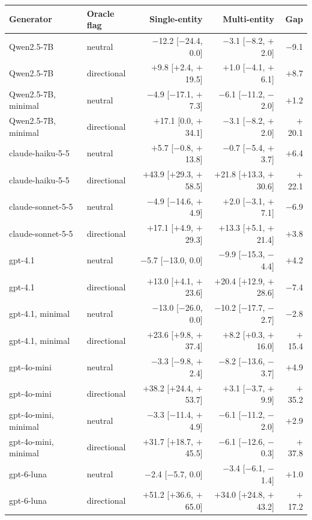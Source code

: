 \begin{table}[t]
\centering\small
\setlength{\tabcolsep}{6pt}
\begin{tabular}{@{}llrrr@{}}
\toprule
Generator & Oracle flag & Single-entity & Multi-entity & Gap \\
\midrule
Qwen2.5-7B & neutral & $-$12.2 [$-$24.4, 0.0] & $-$3.1 [$-$8.2, $+$2.0] & $-$9.1 \\
Qwen2.5-7B & directional & $+$9.8 [$+$2.4, $+$19.5] & $+$1.0 [$-$4.1, $+$6.1] & $+$8.7 \\
Qwen2.5-7B, minimal & neutral & $-$4.9 [$-$17.1, $+$7.3] & $-$6.1 [$-$11.2, $-$2.0] & $+$1.2 \\
Qwen2.5-7B, minimal & directional & $+$17.1 [0.0, $+$34.1] & $-$3.1 [$-$8.2, $+$2.0] & $+$20.1 \\
claude-haiku-5-5 & neutral & $+$5.7 [$-$0.8, $+$13.8] & $-$0.7 [$-$5.4, $+$3.7] & $+$6.4 \\
claude-haiku-5-5 & directional & $+$43.9 [$+$29.3, $+$58.5] & $+$21.8 [$+$13.3, $+$30.6] & $+$22.1 \\
claude-sonnet-5-5 & neutral & $-$4.9 [$-$14.6, $+$4.9] & $+$2.0 [$-$3.1, $+$7.1] & $-$6.9 \\
claude-sonnet-5-5 & directional & $+$17.1 [$+$4.9, $+$29.3] & $+$13.3 [$+$5.1, $+$21.4] & $+$3.8 \\
gpt-4.1 & neutral & $-$5.7 [$-$13.0, 0.0] & $-$9.9 [$-$15.3, $-$4.4] & $+$4.2 \\
gpt-4.1 & directional & $+$13.0 [$+$4.1, $+$23.6] & $+$20.4 [$+$12.9, $+$28.6] & $-$7.4 \\
gpt-4.1, minimal & neutral & $-$13.0 [$-$26.0, 0.0] & $-$10.2 [$-$17.7, $-$2.7] & $-$2.8 \\
gpt-4.1, minimal & directional & $+$23.6 [$+$9.8, $+$37.4] & $+$8.2 [$+$0.3, $+$16.0] & $+$15.4 \\
gpt-4o-mini & neutral & $-$3.3 [$-$9.8, $+$2.4] & $-$8.2 [$-$13.6, $-$3.7] & $+$4.9 \\
gpt-4o-mini & directional & $+$38.2 [$+$24.4, $+$53.7] & $+$3.1 [$-$3.7, $+$9.9] & $+$35.2 \\
gpt-4o-mini, minimal & neutral & $-$3.3 [$-$11.4, $+$4.9] & $-$6.1 [$-$11.2, $-$2.0] & $+$2.9 \\
gpt-4o-mini, minimal & directional & $+$31.7 [$+$18.7, $+$45.5] & $-$6.1 [$-$12.6, $-$0.3] & $+$37.8 \\
gpt-6-luna & neutral & $-$2.4 [$-$5.7, 0.0] & $-$3.4 [$-$6.1, $-$1.4] & $+$1.0 \\
gpt-6-luna & directional & $+$51.2 [$+$36.6, $+$65.0] & $+$34.0 [$+$24.8, $+$43.2] & $+$17.2 \\

\end{tabular}
\end{table}

